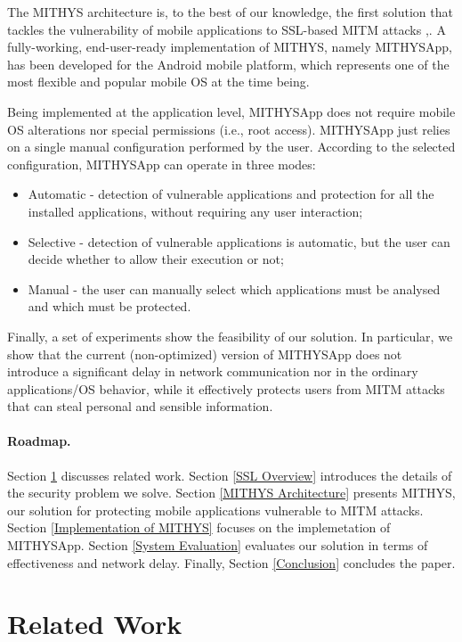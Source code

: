 \documentclass[english]{llncs}
\begin{document}
The MITHYS architecture is, to the best of our knowledge, the first solution that tackles the vulnerability of mobile applications to SSL-based MITM attacks \cite{Fahl:2012:WEM:2382196.2382205},\cite{Georgiev:2012:MDC:2382196.2382204}. A fully-working, end-user-ready implementation of MITHYS, namely MITHYSApp, has been developed for the Android mobile platform, which represents one of the most flexible and popular mobile OS at the time being.

Being implemented at the application level, MITHYSApp does not require mobile OS alterations nor special permissions (i.e., root access). MITHYSApp just relies on a single manual configuration performed by the user. According to the selected configuration, MITHYSApp can operate in three modes:
\begin{itemize}
	\item Automatic - detection of vulnerable applications and protection for all the installed applications, without requiring any user interaction;
	\item Selective - detection of vulnerable applications is automatic, but the user can decide whether to allow their execution or not;
	\item Manual - the user can manually select which applications must be analysed and which must be protected.
\end{itemize}

Finally, a set of experiments show the feasibility of our solution. In particular, we show that the current (non-optimized) version of MITHYSApp does not introduce a significant delay in network communication nor in the ordinary applications/OS behavior, while it effectively protects users from MITM attacks that can steal personal and sensible information.

\paragraph{Roadmap.} Section \ref{Related Work} discusses related work. Section \ref{SSL Overview} introduces the details of the security problem we solve. Section \ref{MITHYS Architecture} presents MITHYS, our solution for protecting mobile applications vulnerable to MITM attacks. Section \ref{Implementation of MITHYS} focuses on the implemetation of MITHYSApp. Section \ref{System Evaluation} evaluates our solution in terms of effectiveness and network delay. Finally, Section \ref{Conclusion} concludes the paper.

\section{Related Work}
\label{Related Work}
\end{document}
